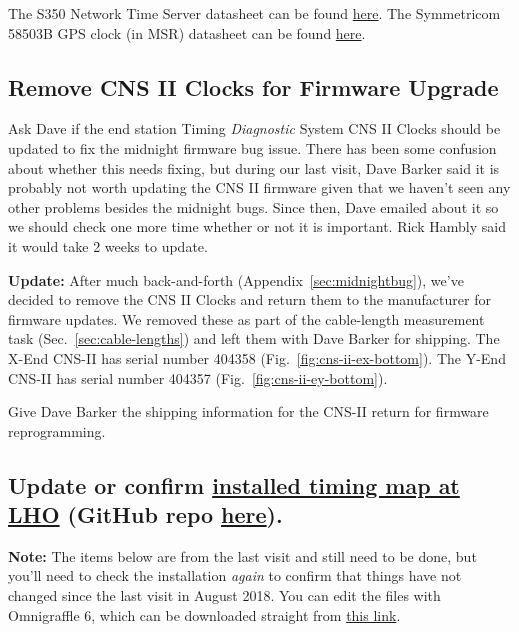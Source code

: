 \documentclass{article}
\newcommand*{\TODO}{\textcolor{todo}}
\begin{document}
The S350 Network Time Server datasheet can be found \href{https://www.microsemi.com/document-portal/doc_view/133759-syncserver-s350-network-time-server-datasheet}{here}. The Symmetricom 58503B GPS clock (in MSR) datasheet can be found \href{https://accusrc.com/uploads/datasheets/4975_58503b.pdf}{here}.

\TODO{\subsection{Remove CNS II Clocks for Firmware Upgrade}}

Ask Dave if the end station Timing \textit{Diagnostic} System CNS II Clocks should be updated to fix the midnight firmware bug issue. There has been some confusion about whether this needs fixing, but during our last visit, Dave Barker said it is probably not worth updating the CNS II firmware given that we haven't seen any other problems besides the midnight bugs. Since then, Dave emailed about it so we should check one more time whether or not it is important. Rick Hambly said it would take 2 weeks to update. 

\textbf{Update:} After much back-and-forth (Appendix~\ref{sec:midnightbug}), we've decided to remove the CNS II Clocks and return them to the manufacturer for firmware updates. We removed these as part of the cable-length measurement task (Sec.~\ref{sec:cable-lengths}) and left them with Dave Barker for shipping. The X-End CNS-II has serial number 404358 (Fig.~\ref{fig:cns-ii-ex-bottom}). The Y-End CNS-II has serial number 404357 (Fig.~\ref{fig:cns-ii-ey-bottom}).

\TODO{Give Dave Barker the shipping information for the CNS-II return for firmware reprogramming.}

\TODO{
\subsection{\label{sec:update-timing-diagram}
    Update or confirm
    \href{https://dcc.ligo.org/LIGO-D1500201}{installed timing map at LHO} (GitHub repo
    \href{https://github.com/stefco/geco_channels}{here}).
}
}
\textbf{Note:} The items below are from the last visit and still need to be done, but you'll need to check the installation \textit{again} to confirm that things have not changed since the last visit in August 2018. You can edit the files with Omnigraffle 6, which can be downloaded straight from \href{https://downloads.omnigroup.com/software/MacOSX/10.10/OmniGraffle-6.6.2.dmg}{this link}.
\end{document}
